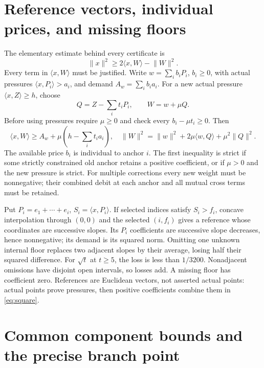 \documentclass[11pt]{article}
\theoremstyle{definition}
\theoremstyle{remark}
\newcommand{\ip}[2]{\langle #1,#2\rangle}
\newcommand{\norm}[1]{\lVert #1\rVert}
\begin{document}
\section{Reference vectors, individual prices, and missing floors}
\label{sec:references}
The elementary estimate behind every certificate is
\begin{equation}
\label{eq:square}
 \norm{x}^2\geq2\ip{x}{W}-\norm{W}^2.
\end{equation}
Every term in \(\ip{x}{W}\) must be justified.
Write \(w=\sum_i b_iP_i\), \(b_i\geq0\), with actual pressures
\(\ip{x}{P_i}>a_i\), and demand \(A_w=\sum_i b_i a_i\).
For a new actual pressure \(\ip{x}{Z}\geq h\), choose
\[
 Q=Z-\sum_i t_iP_i,\qquad W=w+\mu Q.
\]
Before using pressures require \(\mu\geq0\) and check every
\(b_i-\mu t_i\geq0\).
Then
\begin{equation}
\label{eq:payment}
 \ip{x}{W}\geq A_w+\mu(h-\sum_i t_i a_i),\quad
 \norm{W}^2=\norm{w}^2+2\mu\ip{w}{Q}+\mu^2\norm{Q}^2.
\end{equation}
The available price \(b_i\) is individual to anchor \(i\).
The first inequality is strict if some strictly constrained old
anchor retains a positive coefficient, or if \(\mu>0\) and the
new pressure is strict. For multiple corrections every new weight
must be nonnegative; their combined debit at each anchor and all
mutual cross terms must be retained.

Put \(P_i=e_1+\cdots+e_i\), \(S_i=\ip{x}{P_i}\).
If selected indices satisfy \(S_i>f_i\), concave interpolation
through \((0,0)\) and the selected \((i,f_i)\) gives a reference
whose coordinates are successive slopes. Its \(P_i\) coefficients
are successive slope decreases, hence nonnegative; its demand
is its squared norm. Omitting one unknown internal floor replaces
two adjacent slopes by their average, losing half their squared
difference. For \(\sqrt t\) at \(t\geq5\), the loss is less than
\(1/3200\). Nonadjacent omissions have disjoint open intervals,
so losses add. A missing floor has coefficient zero.
References are Euclidean vectors, not asserted actual points:
actual points prove pressures, then positive coefficients combine
them in \eqref{eq:square}.

\section{Common component bounds and the precise branch point}
\label{sec:components}
\end{document}
